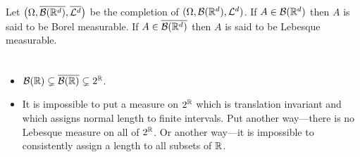 \begin{definition}
Let $\bigl(\Omega,\overline{\mathcal B(\Bbb R^d)},\overline{\mathcal L^d}\bigr)$ be the completion of $(\Omega, \mathcal B(\Bbb R^d),\mathcal L^d)$. If $A\in \mathcal B(\Bbb R^d)$ then $A$ is said to be {Borel measurable}. If $A\in \overline{\mathcal B(\Bbb R^d)}$ then $A$ is said to be {Lebesque measurable}.
\end{definition}

\begin{theorem}
$\phantom{asdf}$
\begin{itemize}
\item $\mathcal B(\Bbb R)\subsetneq \overline{\mathcal B(\Bbb R)} \subsetneq 2^\Bbb R$.
\item It is impossible to put a measure on $2^\Bbb R$ which is translation invariant and which assigns normal length to finite intervals. Put another way---there is no Lebesque measure on all of $2^\Bbb R$. Or another way---it is impossible to consistently assign a length to all subsets of $\Bbb R$.
\end{itemize}
\end{theorem}
